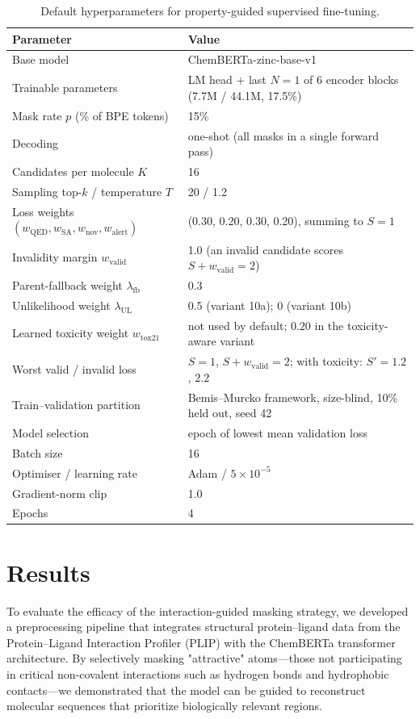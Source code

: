 \documentclass[a4paper,12pt]{article}
\begin{document}
\begin{table}[htbp]
\centering
\caption{Default hyperparameters for property-guided supervised fine-tuning.}
\label{tab:stage10-hparams}
\begin{tabular}{@{}ll@{}}
\toprule
Parameter & Value \\
\midrule
Base model & ChemBERTa-zinc-base-v1~\cite{chithrananda2020chemberta} \\
Trainable parameters & LM head $+$ last $N=1$ of 6 encoder blocks (7.7M / 44.1M, 17.5\%) \\
Mask rate $p$ (\% of BPE tokens) & 15\% \\
Decoding & one-shot (all masks in a single forward pass) \\
Candidates per molecule $K$ & 16 \\
Sampling top-$k$ / temperature $T$ & 20 / 1.2 \\
Loss weights $(w_{\mathrm{QED}}, w_{\mathrm{SA}}, w_{\mathrm{nov}}, w_{\mathrm{alert}})$ & (0.30, 0.20, 0.30, 0.20), summing to $S=1$ \\
Invalidity margin $w_{\mathrm{valid}}$ & 1.0 (an invalid candidate scores $S+w_{\mathrm{valid}}=2$) \\
Parent-fallback weight $\lambda_{\mathrm{fb}}$ & 0.3 \\
Unlikelihood weight $\lambda_{\mathrm{UL}}$ & 0.5 (variant 10a); 0 (variant 10b) \\
Learned toxicity weight $w_{\mathrm{tox21}}$ & not used by default; $0.20$ in the toxicity-aware variant \\
Worst valid / invalid loss & $S=1$, $S+w_{\mathrm{valid}}=2$; with toxicity: $S'=1.2$, $2.2$ \\
Train--validation partition & Bemis--Murcko framework, size-blind, 10\% held out, seed 42 \\
Model selection & epoch of lowest mean validation loss \\
Batch size & 16 \\
Optimiser / learning rate & Adam / $5\times10^{-5}$ \\
Gradient-norm clip & 1.0 \\
Epochs & 4 \\
\bottomrule
\end{tabular}
\end{table}

\FloatBarrier

\section{Results}
To evaluate the efficacy of the interaction-guided masking strategy, we developed a preprocessing pipeline that integrates structural protein–ligand data from the Protein–Ligand Interaction Profiler (PLIP) with the ChemBERTa transformer architecture. By selectively masking "attractive" atoms—those not participating in critical non-covalent interactions such as hydrogen bonds and hydrophobic contacts—we demonstrated that the model can be guided to reconstruct molecular sequences that prioritize biologically relevant regions.
\end{document}
